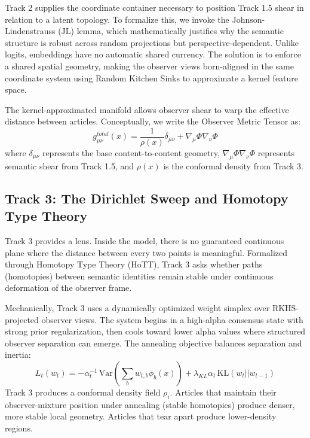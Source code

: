 Track 2 supplies the coordinate container necessary to position Track 1.5 shear in relation to a latent topology. To formalize this, we invoke the Johnson-Lindenstrauss (JL) lemma, which mathematically justifies why the semantic structure is robust across random projections but perspective-dependent. Unlike logits, embeddings have no automatic shared currency. The solution is to enforce a shared spatial geometry, making the observer views born-aligned in the same coordinate system using Random Kitchen Sinks \cite{Rahimi2008} to approximate a kernel feature space.

The kernel-approximated manifold allows observer shear to warp the effective distance between articles. Conceptually, we write the Observer Metric Tensor as:
\begin{equation}
g_{\mu\nu}^{total}(x) = \frac{1}{\rho(x)}\delta_{\mu\nu} + \nabla_\mu \Phi \nabla_\nu \Phi
\end{equation}
where $\delta_{\mu\nu}$ represents the base content-to-content geometry, $\nabla_\mu \Phi \nabla_\nu \Phi$ represents semantic shear from Track 1.5, and $\rho(x)$ is the conformal density from Track 3.

\subsection{Track 3: The Dirichlet Sweep and Homotopy Type Theory}

Track 3 provides a lens. Inside the model, there is no guaranteed continuous plane where the distance between every two points is meaningful. Formalized through Homotopy Type Theory (HoTT), Track 3 asks whether paths (homotopies) between semantic identities remain stable under continuous deformation of the observer frame. 

Mechanically, Track 3 uses a dynamically optimized weight simplex over RKHS-projected observer views. The system begins in a high-alpha consensus state with strong prior regularization, then cools toward lower alpha values where structured observer separation can emerge. The annealing objective balances separation and inertia:
\begin{equation}
L_t(w_t) = -\alpha_t^{-1}\,\mathrm{Var}\left(\sum_b w_{t,b}\phi_b(x)\right) + \lambda_{KL}\alpha_t\,\mathrm{KL}(w_t||w_{t-1})
\end{equation}
Track 3 produces a conformal density field $\rho_i$. Articles that maintain their observer-mixture position under annealing (stable homotopies) produce denser, more stable local geometry. Articles that tear apart produce lower-density regions.

